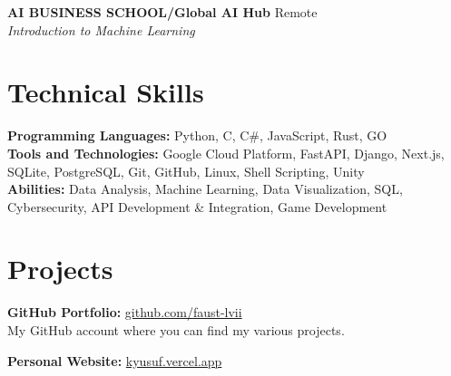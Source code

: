 \documentclass[10pt,a4paper]{extarticle}
\begin{document}
\textbf{AI BUSINESS SCHOOL/Global AI Hub} \hfill Remote\\
\textit{Introduction to Machine Learning}

\section{Technical Skills}
\textbf{Programming Languages:} Python, C, C\#, JavaScript, Rust, GO\\
\textbf{Tools and Technologies:} Google Cloud Platform, FastAPI, Django, Next.js, SQLite, PostgreSQL, Git, GitHub, Linux, Shell Scripting, Unity\\
\textbf{Abilities:} Data Analysis, Machine Learning, Data Visualization, SQL, Cybersecurity, API Development \& Integration, Game Development

\section{Projects}
\textbf{GitHub Portfolio:} \href{https://github.com/faust-lvii}{github.com/faust-lvii}\\
My GitHub account where you can find my various projects.

\textbf{Personal Website:} \href{https://kyusuf.vercel.app}{kyusuf.vercel.app}
\end{document}
